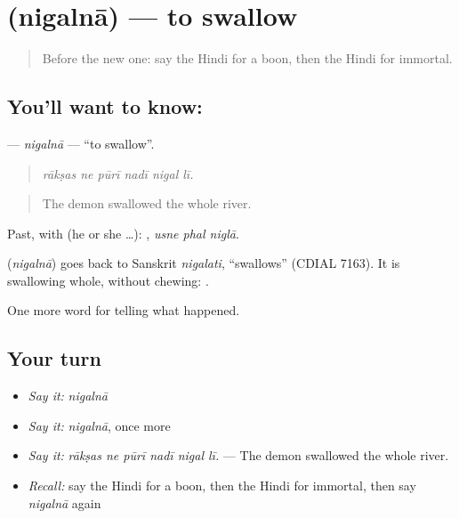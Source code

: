 \section[\texorpdfstring{\hi{निगलना} (nigalnā)}{निगलना (nigalnā)}]{ (nigalnā) — to swallow}

\label{lesson:HI-C335-nigalna}



\begin{quote}
Before the new one: say the Hindi for a boon, then the Hindi for immortal.
\end{quote}

\subsection*{You'll want to know: }
\textbf{} — \emph{nigalnā} — \textquotedblleft{}to swallow\textquotedblright{}.

\begin{quote}
     
\end{quote}

\begin{quote}
\emph{rākṣas ne pūrī nadī nigal lī.}
\end{quote}

\begin{quote}
The demon swallowed the whole river.
\end{quote}

Past, with  (he or she …):   , \emph{usne phal niglā}.

\begin{cousinweb}
\textbf{} (\emph{nigalnā}) goes back to Sanskrit \emph{nigalati}, \textquotedblleft{}swallows\textquotedblright{} (CDIAL 7163). It is swallowing whole, without chewing: \textbf{ }.
\end{cousinweb}

\begin{grammarlens}[title={What you've built}]
One more word for telling what happened.
\end{grammarlens}

\subsection*{Your turn}
\begin{itemize}
\raggedright
  \item \emph{Say it:} \emph{nigalnā}
  \item \emph{Say it:} \emph{nigalnā}, once more
  \item \emph{Say it:} \emph{rākṣas ne pūrī nadī nigal lī.} — The demon swallowed the whole river.
  \item \emph{Recall:} say the Hindi for a boon, then the Hindi for immortal, then say \emph{nigalnā} again
\end{itemize}

